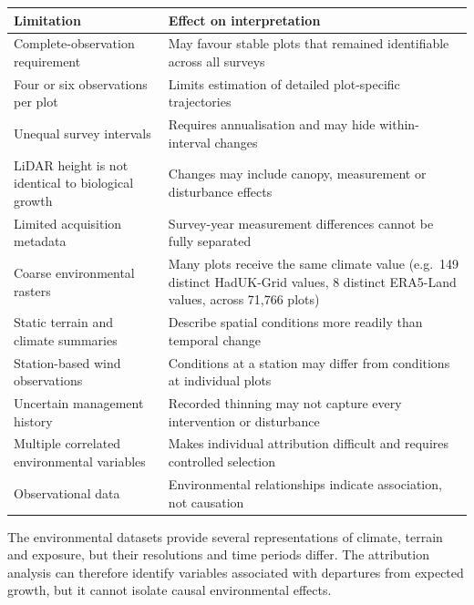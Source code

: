 \begin{table}[h]
\centering
\begin{tabular}{p{5.5cm}p{7.5cm}}
\hline
Limitation & Effect on interpretation \\
\hline
Complete-observation requirement & May favour stable plots that remained identifiable across all surveys \\
Four or six observations per plot & Limits estimation of detailed plot-specific trajectories \\
Unequal survey intervals & Requires annualisation and may hide within-interval changes \\
LiDAR height is not identical to biological growth & Changes may include canopy, measurement or disturbance effects \\
Limited acquisition metadata & Survey-year measurement differences cannot be fully separated \\
Coarse environmental rasters & Many plots receive the same climate value (e.g.\ 149 distinct HadUK-Grid values, 8 distinct ERA5-Land values, across 71,766 plots) \\
Static terrain and climate summaries & Describe spatial conditions more readily than temporal change \\
Station-based wind observations & Conditions at a station may differ from conditions at individual plots \\
Uncertain management history & Recorded thinning may not capture every intervention or disturbance \\
Multiple correlated environmental variables & Makes individual attribution difficult and requires controlled selection \\
Observational data & Environmental relationships indicate association, not causation \\
\hline
\end{tabular}
\end{table}

The environmental datasets provide several representations of climate, terrain and exposure, but their resolutions and time periods differ.
The attribution analysis can therefore identify variables associated with departures from expected growth, but it cannot isolate causal environmental effects.

